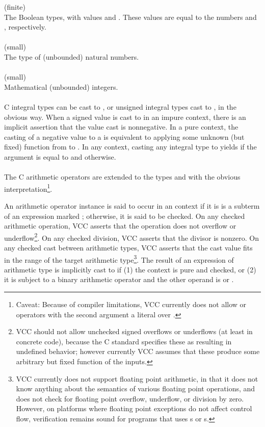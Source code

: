 \documentclass[preprint,nocopyrightspace]{sigplanconf}
\begin{document}
{{\vcc{\bool} (finite)\\
The Boolean types, with values \vcc{\true} and \vcc{\false}. These
values are equal to the \vcc{\natural} numbers  and , respectively.
\\\\
\vcc{\natural} (small)\\
The type of (unbounded) natural numbers. 
\\\\
\vcc{\integer} (small)\\
Mathematical (unbounded) integers. 
\\\\
C integral types can be cast to \vcc{\integer},
or unsigned integral types cast to \vcc{\natural}, in the obvious
way. When a signed value is cast to \vcc{\natural} in an impure
context, there is an implicit assertion that the value cast is
nonnegative. In a pure context, the casting of a negative value to 
a \vcc{\natural} is equivalent to applying some unknown (but fixed)
function from  to . In any context, casting
any integral type to \vcc{\bool} yields \vcc{\true} if the argument
is equal to  and \vcc{\false} otherwise.
\\\\
The C arithmetic operators are extended to the types \vcc{\natural}
and \vcc{\integer} with the obvious interpretation\footnote{
Caveat: Because of compiler limitations, VCC currently does not allow
\vcc{<<} or \vcc{>>} operators with the second argument a literal over .
}. 

An arithmetic operator instance is said to occur in
an \vcc{\unchecked} context if it is is a subterm of an expression
marked ; otherwise, it is said to be checked. 
On any checked arithmetic operation, VCC asserts that the operation
does not overflow or underflow\footnote{
  VCC should not allow unchecked signed overflows or underflows (at
  least in concrete code),
  because the C standard specifies these as resulting in undefined
  behavior; however currently VCC assumes that these produce some
  arbitrary but fixed function of the inputs.
}. On any checked division, VCC asserts
that the divisor is nonzero. On any checked cast between arithmetic
types, VCC asserts that the cast value fits in the range of the target
arithmetic type\footnote{
VCC currently does not support floating point arithmetic, in that it
does not know anything about the semantics of various floating point
operations, and does not check for floating point overflow, underflow,
or division by zero. However, on platforms where floating point
exceptions do not affect control flow, verification remains sound for
programs that uses s or s.
}.
The
result of an expression of arithmetic type is implicitly cast
to \vcc{\integer} if (1) the context is pure and checked, or (2) it is
subject to a binary arithmetic operator and the other operand
is \vcc{\natural} or \vcc{\integer}.

}}
\end{document}

